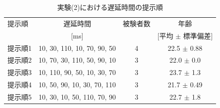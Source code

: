 \begin{table}[btp]
  \caption{実験(2)における遅延時間の提示順}
  \label{table:B_delay_time}
  \centering
  \begin{tabular}{lccc}
    \hline
    提示順 & 遅延時間 & 被験者数 & 年齢\\
    　& [ms] & & [平均 $\pm$ 標準偏差]\\
    \hline \hline
    提示順1  & 10, 30, 110, 10, 70, 90, 50  & 4 & 22.5 $\pm$ 0.88\\
    提示順2  & 10, 70, 30, 110, 50, 90, 10  & 3 & 22.0 $\pm$ 0.0\\
    提示順3  & 10, 110, 90, 50, 10, 30, 70  & 3 & 23.7 $\pm$ 1.3\\
    提示順4  & 10, 50, 90, 10, 30, 70, 110  & 3 & 21.7 $\pm$ 0.49\\
    提示順5  & 10, 30, 10, 50, 110, 70, 90  & 3 & 22.7 $\pm$ 1.8
\\
    \hline
  \end{tabular}
\end{table}
